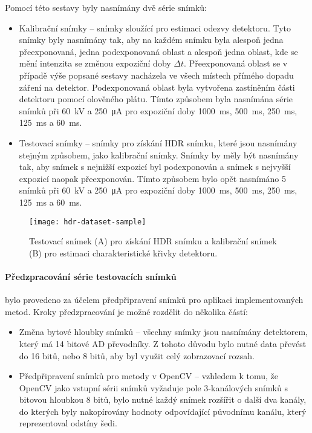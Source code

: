 Pomocí této sestavy byly nasnímány dvě série snímků:
\begin{itemize}
\item Kalibrační snímky -- snímky sloužící pro estimaci odezvy detektoru. Tyto snímky byly nasnímány tak, aby na každém snímku byla alespoň jedna přeexponovaná, jedna podexponovaná oblast a alespoň jedna oblast, kde se mění intenzita se změnou expoziční doby $\Delta t$. Přeexponovaná oblast se v případě výše popsané sestavy nacházela ve všech místech přímého dopadu záření na detektor. Podexponovaná oblast byla vytvořena zastíněním části detektoru pomocí olověného plátu. Tímto způsobem byla nasnímána série snímků při \SI{60}{\kV} a \SI{250}{\micro\ampere} pro expoziční doby \SI{1000}{\ms}, \SI{500}{\ms}, \SI{250}{\ms}, \SI{125}{\ms} a \SI{60}{\ms}.
\item Testovací snímky -- snímky pro získání HDR snímku, které jsou nasnímány stejným způsobem, jako kalibrační snímky. Snímky by měly být nasnímány tak, aby snímek s nejnižší expozicí byl podexponován a snímek s nejvyšší expozicí naopak přeexponován. Tímto způsobem bylo opět nasnímáno 5 snímků při \SI{60}{\kV} a \SI{250}{\micro\ampere} pro expoziční doby \SI{1000}{\ms}, \SI{500}{\ms}, \SI{250}{\ms}, \SI{125}{\ms} a \SI{60}{\ms}.
\end{itemize}

\begin{figure}[htb]
\centering
\texttt{[image: hdr-dataset-sample]}
\caption{Testovací snímek (A) pro získání HDR snímku a kalibrační snímek (B) pro estimaci charakteristické křivky detektoru.}
\label{fig:hdr-dataset-sample}
\end{figure}

\paragraph{Předzpracování série testovacích snímků} bylo provedeno za účelem předpřipravení snímků pro aplikaci implementovaných metod. Kroky předzpracování je možné rozdělit do několika částí:
\begin{itemize}
\item Změna bytové hloubky snímků -- všechny snímky jsou nasnímány detektorem, který má 14 bitové AD převodníky. Z tohoto důvodu bylo nutné data  převést do 16 bitů, nebo 8 bitů, aby byl využit celý zobrazovací rozsah.
\item Předpřipravení snímků pro metody v OpenCV -- vzhledem k tomu, že OpenCV jako vstupní sérii snímků vyžaduje pole 3-kanálových snímků s bitovou hloubkou 8 bitů, bylo nutné každý snímek rozšířit o další dva kanály, do kterých byly nakopírovány hodnoty odpovídající původnímu kanálu, který reprezentoval odstíny šedi.
\end{itemize}

